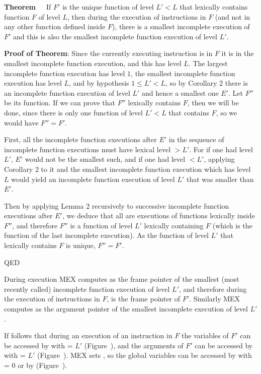 \documentclass[12pt]{article}
\begin{document}
\begin{indpar}
{\bf Theorem}~~~If $F'$ is the unique function of level $L' < L$ that lexically
contains function $F$ of level $L$,
then during the execution of instructions in $F$ (and not in any other
function defined inside $F$),
there is a smallest incomplete execution of $F'$ and this is also
the smallest incomplete function execution of level $L'$.
\end{indpar}

\begin{indpar}
{\bf Proof of Theorem}: Since the currently executing instruction is in $F$
it is in the smallest incomplete function execution, and this has level $L$.
The largest incomplete function execution
has level $1$, the smallest
incomplete function execution has level
$L$, and by hypothesis $1\leq L'<L$,
so by Corollary 2 there is an incomplete function execution of level $L'$
and hence a smallest one $E'$.  Let $F''$ be its function.
If we can prove that $F''$ lexically contains $F$, then we will be done,
since there is only one function of level $L' < L$ that contains $F$,
so we would have $F'' = F'$.

First, all the incomplete function executions after $E'$ in the sequence
of incomplete function executions
must have lexical level $>L'$.  For if one had level $L'$, $E'$ would
not be the smallest such, and if one had level $<L'$, applying Corollary 2
to it and the smallest incomplete function execution which has level $L$ would
yield an incomplete function execution of level $L'$ that was 
smaller than $E'$.

Then by applying Lemma 2 recursively to successive incomplete function
executions after $E'$, we deduce that all are executions of functions
lexically inside $F''$, and therefore $F''$ is a function of
level $L'$ lexically containing $F$ (which is the function of the
last incomplete execution).  As the function of level $L'$
that lexically contains $F$ is unique, $F''=F'$.

QED
\end{indpar}


During execution MEX computes  as the frame pointer
of the smallest (most recently called)
incomplete function execution of level $L'$,
and therefore
during the execution of instructions in $F$,  is the
frame pointer of $F'$.
Similarly MEX computes  as the argument pointer of
the smallest incomplete execution of level $L'$.

If follows that during an execution of an instruction in $F$
the variables of $F'$ can be accessed by
 with  = $L'$
(Figure~),
and the arguments of $F'$ can be
accessed by  with  = $L'$
(Figure~).
MEX sets ,
so the global variables can be accessed by  with  = $0$
or by 
(Figure~).
\end{document}
